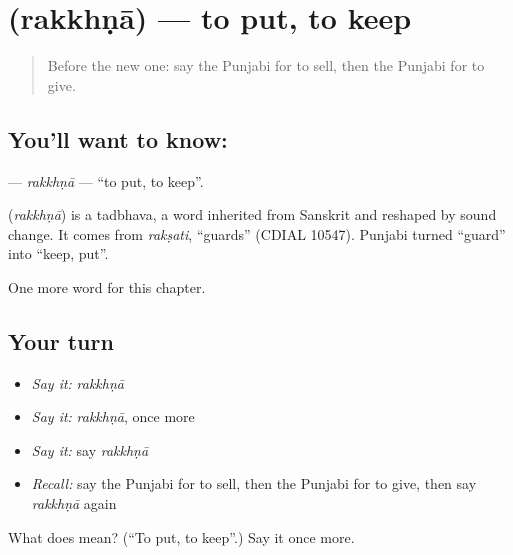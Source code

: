 \section[\texorpdfstring{\pa{ਰੱਖਣਾ} (rakkhṇā)}{ਰੱਖਣਾ (rakkhṇā)}]{ (rakkhṇā) — to put, to keep}

\label{lesson:PA-C58-rakkhna}



\begin{quote}
Before the new one: say the Punjabi for to sell, then the Punjabi for to give.
\end{quote}

\subsection*{You'll want to know: }
\textbf{} — \emph{rakkhṇā} — \textquotedblleft{}to put, to keep\textquotedblright{}.

\begin{cousinweb}
\textbf{} (\emph{rakkhṇā}) is a tadbhava, a word inherited from Sanskrit and reshaped by sound change. It comes from \emph{rakṣati}, \textquotedblleft{}guards\textquotedblright{} (CDIAL 10547). Punjabi turned \textquotedblleft{}guard\textquotedblright{} into \textquotedblleft{}keep, put\textquotedblright{}.
\end{cousinweb}

\begin{grammarlens}[title={What you've built}]
One more word for this chapter.
\end{grammarlens}

\subsection*{Your turn}
\begin{itemize}
\raggedright
  \item \emph{Say it:} \emph{rakkhṇā}
  \item \emph{Say it:} \emph{rakkhṇā}, once more
  \item \emph{Say it:} say \emph{rakkhṇā}
  \item \emph{Recall:} say the Punjabi for to sell, then the Punjabi for to give, then say \emph{rakkhṇā} again
\end{itemize}

\begin{tcolorbox}[breakable,colback=teal!4,colframe=teal!35!black,title={Before you move on}]
What does  mean? (\textquotedblleft{}To put, to keep\textquotedblright{}.) Say it once more.
\end{tcolorbox}
